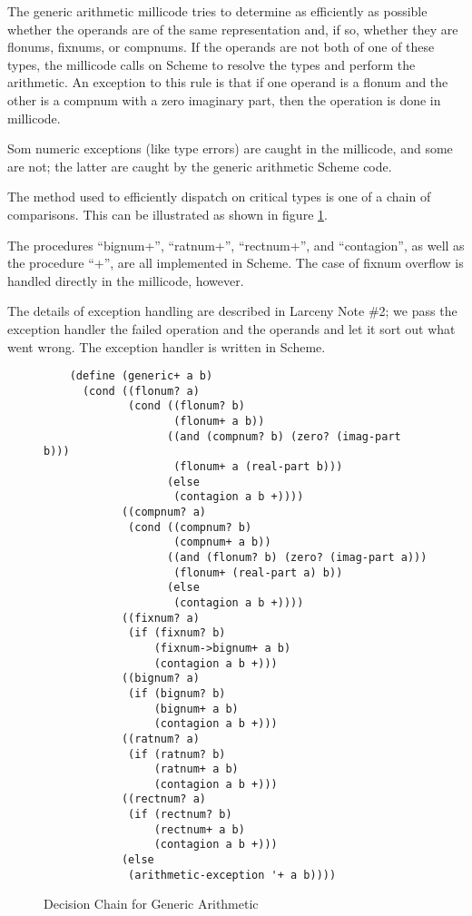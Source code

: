 The generic arithmetic millicode tries to determine as efficiently as
possible whether the operands are of the same representation and, if so,
whether they are flonums, fixnums, or compnums. If the operands are
not both of one of these types, the millicode calls on Scheme to resolve
the types and perform the arithmetic. An exception to this rule is that if one operand is a flonum
and the other is a compnum with a zero imaginary part, then the
operation is done in millicode.

Som numeric exceptions (like type errors) are caught in the millicode, and
some are not; the latter are caught by the generic arithmetic Scheme
code.

The method used to efficiently dispatch on critical types is one of a chain
of comparisons. This can be illustrated as shown in figure \ref{chain}.

The procedures ``bignum+'', ``ratnum+'', ``rectnum+'', and
``contagion'', as well as the procedure ``+'', are all implemented in
Scheme. The case of fixnum overflow is handled directly in the
millicode, however.

The details of exception handling are described in Larceny Note \#2;
we pass the exception handler the failed operation and the operands and
let it sort out what went wrong. The exception handler is written in
Scheme.

\begin{figure}[hbt]
\begin{verbatim}
    (define (generic+ a b)
      (cond ((flonum? a)
             (cond ((flonum? b) 
                    (flonum+ a b))
                   ((and (compnum? b) (zero? (imag-part b)))
                    (flonum+ a (real-part b)))
                   (else
                    (contagion a b +))))
            ((compnum? a)
             (cond ((compnum? b)
                    (compnum+ a b))
                   ((and (flonum? b) (zero? (imag-part a)))
                    (flonum+ (real-part a) b))
                   (else
                    (contagion a b +))))
            ((fixnum? a)
             (if (fixnum? b)
                 (fixnum->bignum+ a b)
                 (contagion a b +)))
            ((bignum? a)
             (if (bignum? b)
                 (bignum+ a b)
                 (contagion a b +)))
            ((ratnum? a)
             (if (ratnum? b)
                 (ratnum+ a b)
                 (contagion a b +)))
            ((rectnum? a)
             (if (rectnum? b)
                 (rectnum+ a b)
                 (contagion a b +)))
            (else
             (arithmetic-exception '+ a b))))
\end{verbatim}
\caption{Decision Chain for Generic Arithmetic}
\label{chain}
\end{figure}

